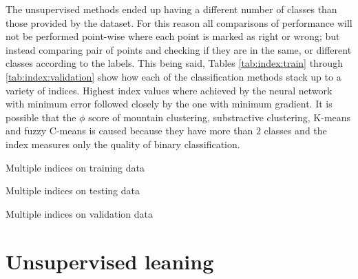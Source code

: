 The unsupervised methods ended up having a different number of classes than
those provided by the dataset. For this reason all comparisons of performance
will not be performed point-wise where each point is marked as right or wrong;
but instead comparing pair of points and checking if they are in the same, or
different classes according to the labels. This being said, Tables
\ref{tab:index:train} through \ref{tab:index:validation} show how each of the
classification methods stack up to a variety of indices. Highest index values
where achieved by the neural network with minimum error followed closely by the
one with minimum gradient. It is possible that the $\phi$ score of mountain
clustering, substractive clustering, K-means and fuzzy C-means is caused because
they have more than $2$ classes and the index measures only the quality of
binary classification.

\begin{table*}
    {\csvlinetotablerow}%
    \caption{Multiple indices on training data\label{tab:index:train}}
\end{table*}

\begin{table*}
    {\csvlinetotablerow}%
    \caption{Multiple indices on testing data\label{tab:index:test}}
\end{table*}

\begin{table*}
    {\csvlinetotablerow}%
    \caption{Multiple indices on validation data\label{tab:index:validation}}
\end{table*}



\section{Unsupervised leaning\label{sec:unsupervised}}